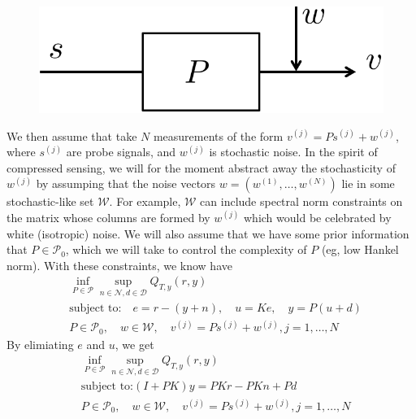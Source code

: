 \documentclass[11pt]{article} %
\newcommand{\calW}{\mathcal{W}}
\newcommand{\calD}{\mathcal{D}}
\newcommand{\calN}{\mathcal{N}}
\newcommand{\calP}{\mathcal{P}}
\theoremstyle{plain}
\theoremstyle{definition}
\theoremstyle{remark}
\begin{document}
\begin{figure}[h!]
  \centering
  \includegraphics[width=.3\linewidth]{sys3.pdf}
\end{figure}

We then assume that take $N$ measurements of the form $v^{(j)} = Ps^{(j)} + w^{(j)}$, where $s^{(j)}$ are probe signals, and $w^{(j)}$ is stochastic noise. In the spirit of compressed sensing, we will for the moment abstract away the stochasticity of $w^{(j)}$ by assumping that the noise vectors $w = (w^{(1)},\dots,w^{(N)})$ lie in some stochastic-like set $\calW$. For example, $\calW$ can include spectral norm constraints on the matrix whose columns are formed by $w^{(j)}$ which would be celebrated by white (isotropic) noise. We will also assume that we have some prior information that $P \in \calP_0$, which we will take to control the complexity of $P$ (eg, low Hankel norm). With these constraints, we know have
\begin{equation}\label{OPT2}
\begin{aligned}
&\inf_{P \in \calP} \sup_{n \in \calN,d \in \calD} Q_{T,y}(r,y)  \\
&\text{subject to:} \quad e = r - (y+n), \quad u = Ke,\quad  y = P(u+d)\\
& P \in \calP_0, \quad w \in \calW, \quad v^{(j)} = Ps^{(j)} + w^{(j)}, j = 1,\dots,N
\end{aligned}
\end{equation}
By elimiating $e$ and $u$, we get
\begin{equation}\label{OPT3}
\begin{aligned}
&\inf_{P \in \calP} \sup_{n \in \calN,d \in \calD} Q_{T,y}(r,y)  \\
&\text{subject to:}   (I+PK)y = PKr - PKn + Pd\\
& P \in \calP_0, \quad w \in \calW, \quad v^{(j)} = Ps^{(j)} + w^{(j)}, j = 1,\dots,N
\end{aligned}
\end{equation}
\end{document}
